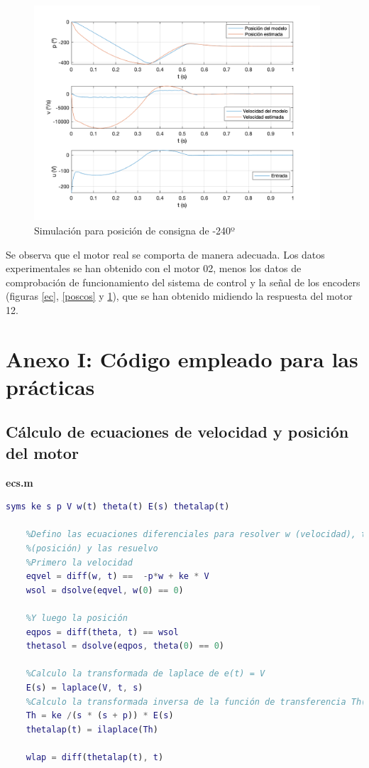 \documentclass[a4paper, 12pt]{article}
\begin{document}
\begin{figure}[H]
	\centering
	\includegraphics*[height = 8cm]{figs/p6/cons-240}
	\caption{Simulación para posición de consigna de -240º} \label{negcos}
\end{figure}
Se observa que el motor real se comporta de manera adecuada. Los datos experimentales se han obtenido con el motor 02, menos los datos de comprobación de funcionamiento del sistema de control y la señal de los encoders (figuras \ref{ec}, \ref{poscos} y \ref{negcos}), que se han obtenido midiendo la respuesta del motor 12.

\newpage
\section*{Anexo I: Código empleado para las prácticas}
\subsection*{Cálculo de ecuaciones de velocidad y posición del motor}
\textbf{ecs.m}
\begin{lstlisting}[language = Matlab]
	syms ke s p V w(t) theta(t) E(s) thetalap(t)

	%Defino las ecuaciones diferenciales para resolver w (velocidad), theta
	%(posición) y las resuelvo 
	%Primero la velocidad
	eqvel = diff(w, t) ==  -p*w + ke * V
	wsol = dsolve(eqvel, w(0) == 0)
	
	%Y luego la posición
	eqpos = diff(theta, t) == wsol 
	thetasol = dsolve(eqpos, theta(0) == 0) 
	
	%Calculo la transformada de laplace de e(t) = V
	E(s) = laplace(V, t, s) 
	%Calculo la transformada inversa de la función de transferencia Th(s)
	Th = ke /(s * (s + p)) * E(s) 
	thetalap(t) = ilaplace(Th)
	
	wlap = diff(thetalap(t), t)
\end{lstlisting}
\end{document}
